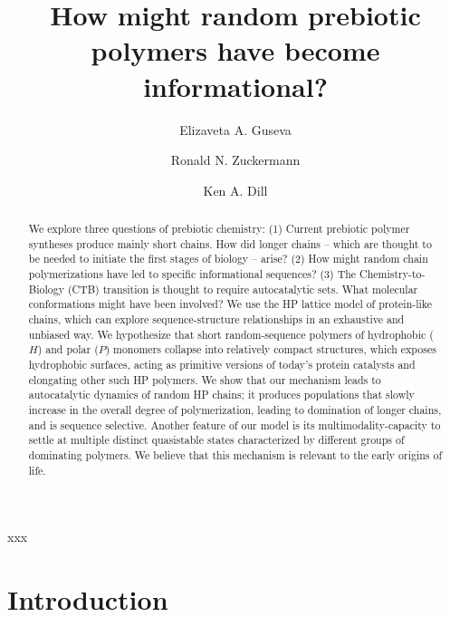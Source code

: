 \documentclass[5p,times]{elsarticle}
\begin{document}
\begin{frontmatter}

\title{How might random prebiotic polymers have become informational?}
% 
\author[addr1]{Elizaveta A. Guseva}
\author[addr2]{Ronald N. Zuckermann}
\author[addr1]{Ken A. Dill}
% 
\address[addr1]{Laufer Center for Physical and Quantitative Biology, Stony Brook 
University, Stony Brook, NY, (United States)}
\address[addr2]{Lawrence Berkeley National Laboratory (LBNL), Berkeley, CA (United States)}

\begin{abstract}
We explore three questions of prebiotic chemistry:  
(1) Current prebiotic polymer syntheses produce mainly short chains.  How did longer chains -- 
which are thought to be needed to initiate the first stages of biology -- arise?  (2) How might 
random chain polymerizations have led to specific informational sequences?  (3) The 
Chemistry-to-Biology (CTB) transition is thought to require autocatalytic sets.  What molecular 
conformations might have been involved?  We use the HP lattice model of protein-like chains, which 
can explore sequence-structure 
relationships in an exhaustive and unbiased way.  We hypothesize that short random-sequence polymers 
of hydrophobic ($H$) and polar ($P$) monomers collapse into relatively compact structures, which 
exposes hydrophobic surfaces, acting as primitive versions of today's protein catalysts and 
elongating 
other such HP polymers.  We show that our mechanism leads to  autocatalytic 
dynamics of random HP chains; it produces populations that slowly increase in the overall degree 
of polymerization,  leading to domination of longer chains, and is sequence selective. 
Another feature of our model is its multimodality-capacity to settle at multiple distinct 
quasistable states characterized by different groups of dominating polymers.
We believe that this mechanism is relevant to the early origins of life.
\end{abstract}

% 
\begin{keyword}
xxx
\end{keyword}

\end{frontmatter}
\section{Introduction} 
\end{document}
